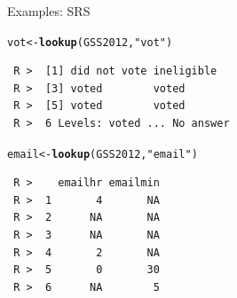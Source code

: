 \documentclass[10pt]{beamer}\usepackage[]{graphicx}\usepackage[]{xcolor}
\makeatletter
\newcommand{\hlstr}[1]{\textcolor[rgb]{0.192,0.494,0.8}{#1}}%
\newcommand{\hlstd}[1]{\textcolor[rgb]{0.345,0.345,0.345}{#1}}%
\newcommand{\hlkwb}[1]{\textcolor[rgb]{0.69,0.353,0.396}{#1}}%
\newcommand{\hlkwd}[1]{\textcolor[rgb]{0.737,0.353,0.396}{\textbf{#1}}}%
\newenvironment{kframe}{%
 \def\at@end@of@kframe{}%
 \ifinner\ifhmode%
  \def\at@end@of@kframe{\end{minipage}}%
  \begin{minipage}{\columnwidth}%
 \fi\fi%
 \def\FrameCommand##1{\hskip\@totalleftmargin \hskip-\fboxsep
 \colorbox{shadecolor}{##1}\hskip-\fboxsep
     \hskip-\linewidth \hskip-\@totalleftmargin \hskip\columnwidth}%
 \MakeFramed {\advance\hsize-\width
   \@totalleftmargin\z@ \linewidth\hsize
   \@setminipage}}%
 {\par\unskip\endMakeFramed%
 \at@end@of@kframe}
\newenvironment{knitrout}{}{} %
\makeatother
\begin{document}
\begin{frame}[containsverbatim]{Examples: SRS}
\tiny
\begin{knitrout}
\color{fgcolor}\begin{kframe}
\begin{alltt}
\hlstd{vot} \hlkwb{<-} \hlkwd{lookup}\hlstd{(GSS2012,} \hlstr{"vot"}\hlstd{)}
\end{alltt}
\begin{verbatim}
 R >  [1] did not vote ineligible  
 R >  [3] voted        voted       
 R >  [5] voted        voted       
 R >  6 Levels: voted ... No answer
\end{verbatim}
\begin{alltt}
\hlstd{email} \hlkwb{<-} \hlkwd{lookup}\hlstd{(GSS2012,} \hlstr{"email"}\hlstd{)}
\end{alltt}
\begin{verbatim}
 R >    emailhr emailmin
 R >  1       4       NA
 R >  2      NA       NA
 R >  3      NA       NA
 R >  4       2       NA
 R >  5       0       30
 R >  6      NA        5
\end{verbatim}
\end{kframe}
\end{knitrout}
\end{frame}
\end{document}
